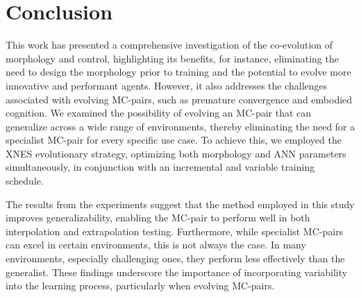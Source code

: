 \section{Conclusion}
    This work has presented a comprehensive investigation of the co-evolution of morphology and control, highlighting its benefits, for instance, eliminating the need to design the morphology prior to training and the potential to evolve more innovative and performant agents. However, it also addresses the challenges associated with evolving MC-pairs, such as premature convergence and embodied cognition. We examined the possibility of evolving an MC-pair that can generalize across a wide range of environments, thereby eliminating the need for a specialist MC-pair for every specific use case. To achieve this, we employed the XNES evolutionary strategy, optimizing both morphology and ANN parameters simultaneously, in conjunction with an incremental and variable training schedule.

    The results from the experiments suggest that the method employed in this study improves generalizability, enabling the MC-pair to perform well in both interpolation and extrapolation testing. Furthermore, while specialist MC-pairs can excel in certain environments, this is not always the case. In many environments, especially challenging ones, they perform less effectively than the generalist. These findings underscore the importance of incorporating variability into the learning process, particularly when evolving MC-pairs.